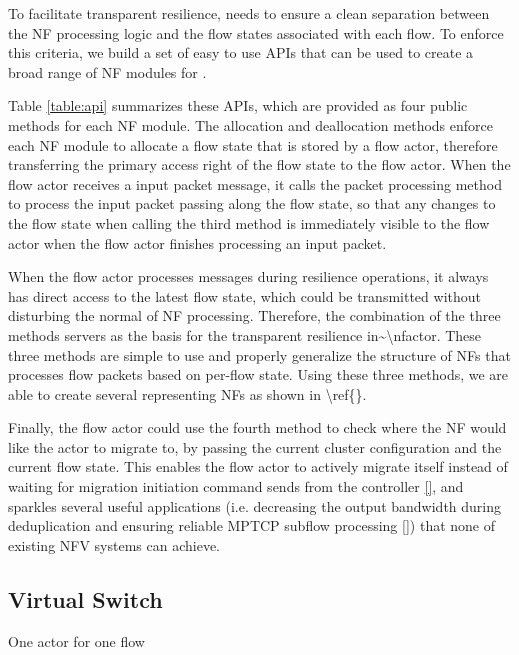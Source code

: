 To facilitate transparent resilience, \nfactor needs to ensure a clean separation between the NF processing logic and the flow states associated with each flow. To enforce this criteria, we build a set of easy to use APIs that can be used to create a broad range of NF modules for \nfactor.

Table \ref{table:api} \ac{summarizes these APIs, which are provided as four public methods for each NF module. The allocation and deallocation methods enforce each NF module to allocate a flow state that is stored by a flow actor, therefore transferring the primary access right of the flow state to the flow actor. When the flow actor receives a input packet message, it calls the packet processing method to process the input packet passing along the flow state, so that any changes to the flow state when calling the third method is immediately visible to the flow actor when the flow actor finishes processing an input packet.}

\ac{When the flow actor processes messages during resilience operations, it always has direct access to the latest flow state, which could be transmitted without disturbing the normal of NF processing. Therefore, the combination of the three methods servers as the basis for the transparent resilience in~\nfactor. These three methods are simple to use and properly generalize the structure of NFs that processes flow packets based on per-flow state. Using these three methods, we are able to create several representing NFs as shown in \ref{}.} 

Finally, the flow actor could use the fourth method to check where the NF would like the actor to migrate to, by passing the current cluster configuration and the current flow state. This enables the flow actor to actively migrate itself instead of waiting for migration initiation command sends from the controller \ref{}, and sparkles several useful applications (i.e. decreasing the output bandwidth during deduplication and ensuring reliable MPTCP subflow processing \ref{}) that none of existing NFV systems can achieve.


\subsection{Virtual Switch}
\label{sec:virtualswitch}

One actor for one flow

